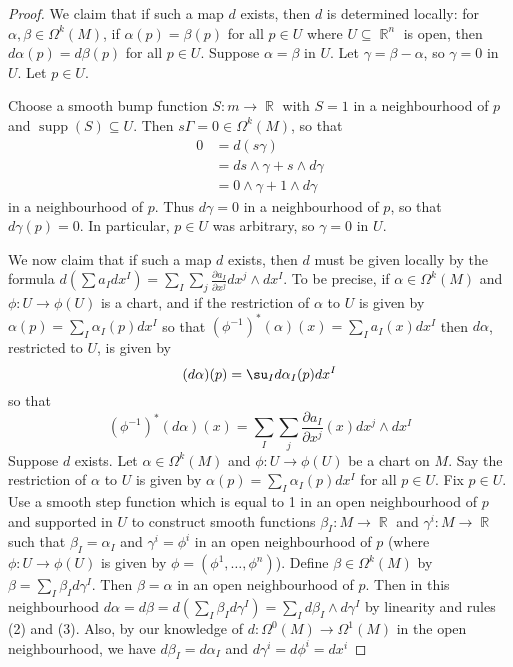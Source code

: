 \documentclass[11pt, a4paper]{memoir}
\DeclareMathOperator{\R}{{\mathbb{R}}}
\theoremstyle{change}
\theoremstyle{plain}
\theoremstyle{nonumberplain}
\newtheorem{proof}{Proof}
\DeclareMathOperator{\supp}{supp}
\newcommand{\prt}[2]{\ensuremath{\frac{\partial #1}{\partial #2}}}
\numberwithin{equation}{section}
\begin{document}
\begin{proof}
    We claim that if such a map $d$ exists, then $d$ is determined locally: for $\alpha,\beta\in\Omega^k(M)$, if $\alpha(p)=\beta(p)$ for all $p\in U$ where $U\subseteq\R^n$ is open, then $d\alpha(p)=d\beta(p)$ for all $p\in U$.
    Suppose $\alpha=\beta$ in $U$.
    Let $\gamma=\beta-\alpha$, so $\gamma=0$ in $U$.
    Let $p\in U$.

    Choose a smooth bump function $S:m\to\R$ with $S=1$ in a neighbourhood of $p$ and $\supp(S)\subseteq U$.
    Then $s\Gamma=0\in\Omega^k(M)$, so that
    \begin{align*}
        0 &= d(s\gamma)\\
          &= ds\wedge\gamma+s\wedge d\gamma\\
          &= 0\wedge\gamma+1\wedge d\gamma
    \end{align*}
    in a neighbourhood of $p$.
    Thus $d\gamma=0$ in a neighbourhood of $p$, so that $d\gamma(p)=0$.
    In particular, $p\in U$ was arbitrary, so $\gamma=0$ in $U$.

    We now claim that if such a map $d$ exists, then $d$ must be given locally by the formula $d(\sum a_Idx^I)=\sum_I\sum_j\prt{a_I}{x^j}dx^j\wedge dx^I$.
    To be precise, if $\alpha\in\Omega^k(M)$ and $\phi:U\to\phi(U)$ is a chart, and if the restriction of $\alpha$ to $U$ is given by $\alpha(p)=\sum_I\alpha_I(p)dx^I$ so that $(\phi^{-1})^*(\alpha)(x)=\sum_Ia_I(x)dx^I$ then $d\alpha$, restricted to $U$, is given by
    \begin{equation*}
        (d\alpha)(p)=\su_Id\alpha_I(p)dx^I
    \end{equation*}
    so that
    \begin{equation*}
        (\phi^{-1})^*(d\alpha)(x)=\sum_I\sum_j\prt{a_I}{x^j}(x)dx^j\wedge dx^I
    \end{equation*}
    Suppose $d$ exists.
    Let $\alpha\in\Omega^k(M)$ and $\phi:U\to\phi(U)$ be a chart on $M$.
    Say the restriction of $\alpha$ to $U$ is given by $\alpha(p)=\sum_I\alpha_I(p)dx^I$ for all $p\in U$.
    Fix $p\in U$.
    Use a smooth step function which is equal to 1 in an open neighbourhood of $p$ and supported in $U$ to construct smooth functions $\beta_I:M\to\R$ and $\gamma^i:M\to\R$ such that $\beta_I=\alpha_I$ and $\gamma^i=\phi^i$ in an open neighbourhood of $p$ (where $\phi:U\to\phi(U)$ is given by $\phi=(\phi^1,\ldots,\phi^n)$).
    Define $\beta\in\Omega^k(M)$ by $\beta=\sum_I\beta_Id\gamma^I$.
    Then $\beta=\alpha$ in an open neighbourhood of $p$.
    Then in this neighbourhood $d\alpha=d\beta=d(\sum_I\beta_Id\gamma^I)=\sum_Id\beta_I\wedge d\gamma^I$ by linearity and rules (2) and (3).
    Also, by our knowledge of $d:\Omega^0(M)\to\Omega^1(M)$ in the open neighbourhood, we have $d\beta_I=d\alpha_I$ and $d\gamma^i=d\phi^i=dx^i$


\end{proof}
\end{document}
